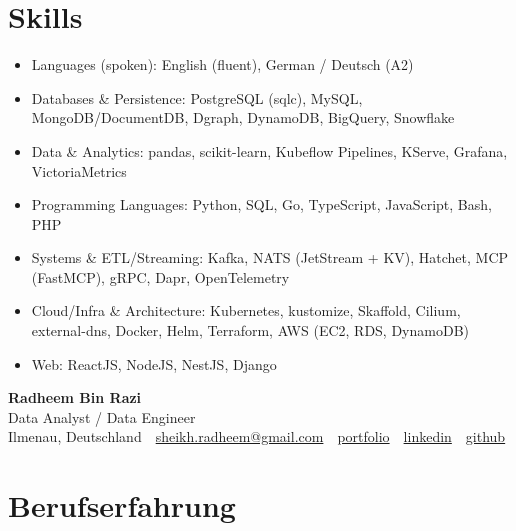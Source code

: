 \documentclass[10pt,a4paper]{resume}
\makeatletter
\newcommand{\Portfolio}{https://radheem.github.io/my-cv}
\newcommand{\PortfolioText}{portfolio}
\newcommand{\GitHub}{https://github.com/radheem}
\newcommand{\LinkedIn}{https://www.linkedin.com/in/radheem-razi}
\newcommand{\Email}{sheikh.radheem@gmail.com}
\makeatother
\begin{document}
\section{Skills}

\begin{itemize}[leftmargin=1.4em,nosep,topsep=2pt]
  \item Languages (spoken): English (fluent), German / Deutsch (A2)
  \item Databases \& Persistence: PostgreSQL (sqlc), MySQL, MongoDB/DocumentDB, Dgraph, DynamoDB, BigQuery, Snowflake
  \item Data \& Analytics: pandas, scikit-learn, Kubeflow Pipelines, KServe, Grafana, VictoriaMetrics
  \item Programming Languages: Python, SQL, Go, TypeScript, JavaScript, Bash, PHP
  \item Systems \& ETL/Streaming: Kafka, NATS (JetStream + KV), Hatchet, MCP (FastMCP), gRPC, Dapr, OpenTelemetry
  \item Cloud/Infra \& Architecture: Kubernetes, kustomize, Skaffold, Cilium, external-dns, Docker, Helm, Terraform, AWS (EC2, RDS, DynamoDB)
  \item Web: ReactJS, NodeJS, NestJS, Django
\end{itemize}

\clearpage
{}

\begin{center}
  {\huge\bfseries Radheem Bin Razi}\\[3pt]
  {\large Data Analyst / Data Engineer}\\[6pt]
  \small
  Ilmenau, Deutschland \,\textbar\,
  \href{mailto:\Email}{\Email} \,\textbar\,
  \href{\Portfolio}{\PortfolioText} \,\textbar\,
  \href{\LinkedIn}{linkedin} \,\textbar\,
  \href{\GitHub}{github}
\end{center}
\vspace{2pt}

\section{Berufserfahrung}
\end{document}
